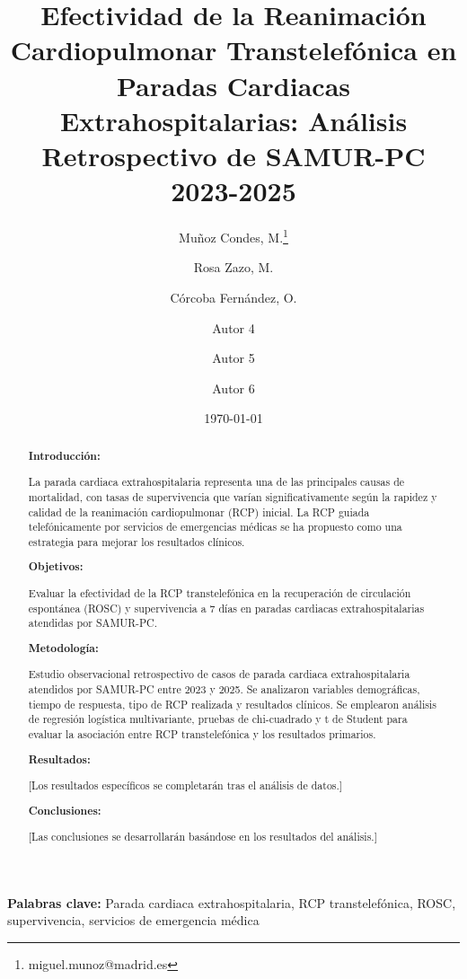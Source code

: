 \documentclass[10pt,a4paper]{article}
\title{\textbf{Efectividad de la Reanimación Cardiopulmonar Transtelefónica en Paradas Cardiacas Extrahospitalarias: Análisis Retrospectivo de SAMUR-PC 2023-2025}}
\author[1]{Muñoz Condes, M.\thanks{miguel.munoz@madrid.es}}
\author[1]{Rosa Zazo, M.}
\author[1]{Córcoba Fernández, O.}
\author[1]{Autor 4}
\author[1]{Autor 5}
\author[1]{Autor 6}
\affil[1]{SAMUR-PC, Madrid, España}
\date{\today}
\begin{document}
\maketitle

\begin{abstract}
\textbf{Introducción:} 

La parada cardiaca extrahospitalaria representa una de las principales causas de mortalidad, con tasas de supervivencia que varían significativamente según la rapidez y calidad de la reanimación cardiopulmonar (RCP) inicial. La RCP guiada telefónicamente por servicios de emergencias médicas se ha propuesto como una estrategia para mejorar los resultados clínicos.

\textbf{Objetivos:} 

Evaluar la efectividad de la RCP transtelefónica en la recuperación de circulación espontánea (ROSC) y supervivencia a 7 días en paradas cardiacas extrahospitalarias atendidas por SAMUR-PC.

\textbf{Metodología:} 

Estudio observacional retrospectivo de casos de parada cardiaca extrahospitalaria atendidos por SAMUR-PC entre 2023 y 2025. Se analizaron variables demográficas, tiempo de respuesta, tipo de RCP realizada y resultados clínicos. Se emplearon análisis de regresión logística multivariante, pruebas de chi-cuadrado y t de Student para evaluar la asociación entre RCP transtelefónica y los resultados primarios.

\textbf{Resultados:} 

[Los resultados específicos se completarán tras el análisis de datos.]

\textbf{Conclusiones:} 

[Las conclusiones se desarrollarán basándose en los resultados del análisis.]
\end{abstract}

\noindent\textbf{Palabras clave:} Parada cardiaca extrahospitalaria, RCP transtelefónica, ROSC, supervivencia, servicios de emergencia médica

\newpage
\end{document}
